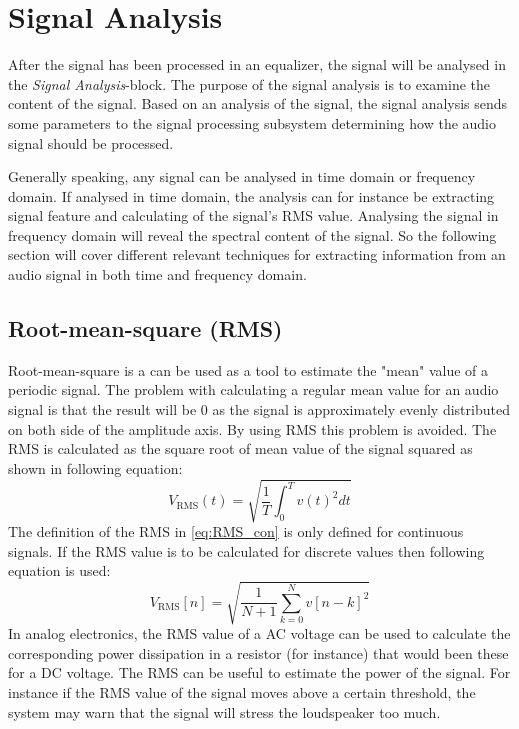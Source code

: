 \section{Signal Analysis}

After the signal has been processed in an equalizer, the signal will be analysed in the \textit{Signal Analysis}-block. The purpose of the signal analysis is to examine the content of the signal. Based on an analysis of the signal, the signal analysis sends some parameters to the signal processing subsystem determining how the audio signal should be processed. 

Generally speaking, any signal can be analysed in time domain or frequency domain. If analysed in time domain, the analysis can for instance be extracting signal feature and calculating of the signal's RMS value. Analysing the signal in frequency domain will reveal the spectral content of the signal. So the following section will cover different relevant techniques for extracting information from an audio signal in both time and frequency domain.

\subsection*{Root-mean-square (RMS)}
Root-mean-square is a can be used as a tool to estimate the "mean" value of a periodic signal. The problem with calculating a regular mean value for an audio signal is that the result will be 0 as the signal is approximately evenly distributed on both side of the amplitude axis. By using RMS this problem is avoided. The RMS is calculated as the square root of mean value of the signal squared as shown in following equation:
\begin{equation}\label{eq:RMS_con}
V_{\text{RMS}}(t) = \sqrt{\frac{1}{T}\int_0^T v(t)^2 dt}
\end{equation}
The definition of the RMS in \autoref{eq:RMS_con} is only defined for continuous signals. If the RMS value is to be calculated for discrete values then following equation is used:
\begin{equation}
V_{\text{RMS}}[n] = \sqrt{\frac{1}{N+1}\sum_{k=0}^{N} v[n-k]^2}
\end{equation}
In analog electronics, the RMS value of a AC voltage can be used to calculate the corresponding power dissipation in a resistor (for instance) that would been these for  a DC voltage. The RMS can be useful to estimate the power of the signal. For instance if the RMS value of the signal moves above a certain threshold, the system may warn that the signal will stress the loudspeaker too much.

